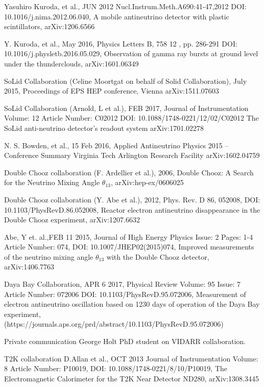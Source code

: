 \documentclass[12pt,a4paper]{article}
\begin{document}
\begin{thebibliography}{9}
Yasuhiro Kuroda, et al., JUN 2012 Nucl.Instrum.Meth.A690:41-47,2012 DOI: 10.1016/j.nima.2012.06.040, A mobile antineutrino detector with plastic scintillators, arXiv:1206.6566

Y. Kuroda, et al., May 2016, Physics Letters B, 758 12 , pp. 286-291 DOI: 10.1016/j.physletb.2016.05.029, Observation of gamma ray bursts at ground level under the thunderclouds, arXiv:1601.06349

SoLid Collaboration (Celine Moortgat on behalf of Solid Collaboration), July 2015, Proceedings of EPS HEP conference, Vienna arXiv:1511.07603

SoLid Collaboration (Arnold, L et al.), FEB 2017, Journal of Instrumentation Volume: 12 Article Number: C02012 DOI: 10.1088/1748-0221/12/02/C02012 The SoLid anti-neutrino detector's readout system arXiv:1701.02278

N. S. Bowden, et al., 15 Feb 2016, Applied Antineutrino Physics 2015 -- Conference Summary Virginia Tech Arlington Research Facility arXiv:1602.04759 

Double Chooz collaboration (F. Ardellier et al.), 2006, Double Chooz: A Search for the Neutrino Mixing Angle $\theta_{13}$, arXiv:hep-ex/0606025

Double Chooz collaboration (Y. Abe et al.), 2012, Phys. Rev. D 86, 052008, DOI: 10.1103/PhysRevD.86.052008, Reactor electron antineutrino disappearance in the Double Chooz experiment, arXiv:1207.6632

Abe, Y et. al.,FEB 11 2015, Journal of High Energy Physics Issue: 2  Pages: 1-4 Article Number: 074, DOI: 10.1007/JHEP02(2015)074, Improved measurements of the neutrino mixing angle $\theta_{13}$ with the Double Chooz detector, arXiv:1406.7763 

Daya Bay Collaboration, APR 6 2017, Physical Review Volume: 95  Issue: 7 Article Number: 072006 DOI: 10.1103/PhysRevD.95.072006, Measurement of electron antineutrino oscillation based on 1230 days of operation of the Daya Bay experiment, (https://journals.aps.org/prd/abstract/10.1103/PhysRevD.95.072006)

Private communication George Holt PhD student on VIDARR collaboration. 

T2K collaboration D.Allan et al., OCT 2013 Journal of Instrumentation Volume: 8 Article Number: P10019, DOI: 10.1088/1748-0221/8/10/P10019, The Electromagnetic Calorimeter for the T2K Near Detector ND280,	arXiv:1308.3445


\end{thebibliography}
\end{document}
